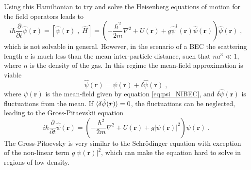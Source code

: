 Using this Hamiltonian to try and solve the Heisenberg equations of motion for the field operators leads to
\begin{equation}
	i \hbar \frac{\partial }{\partial t} \hat{\psi}(\boldsymbol{r}) = \left[ \hat{\psi}(\boldsymbol{r}) \; , \; \hat{H}  \right] = \left( - \frac{\hbar^2}{2 m} \nabla^2 + U(\boldsymbol{r}) + g \hat{\psi}^{\dag}(\boldsymbol{r}) \hat{\psi}(\boldsymbol{r}) \right) \hat{\psi}(\boldsymbol{r}) \; ,
\end{equation}
which is not solvable in general. However, in the scenario of a BEC the scattering length $a$ is much less than the mean inter-particle distance, such that $n a^3 \ll 1$, where $n$ is the density of the gas. In this regime the mean-field approximation is viable
\begin{equation}
	\hat{\psi}(\boldsymbol{r}) = \psi(\boldsymbol{r}) + \delta \hat{\psi}(\boldsymbol{r}) \; ,
\end{equation}
where $\psi(\boldsymbol{r})$ is the mean-field given by equation \ref{eq:psi_NIBEC}, and $\delta \hat{\psi}(\boldsymbol{r})$ is fluctuations from the mean. If $\braket{\delta \hat{\psi}(\boldsymbol{r})} = 0$, the fluctuations can be neglected, leading to the Gross-Pitaevskii equation \cite{Gross1961,Pitaevskii}
\begin{equation}
	i \hbar \frac{\partial }{\partial t} \hat{\psi}(\boldsymbol{r}) = \left( - \frac{\hbar^2}{2 m} \nabla^2 + U(\boldsymbol{r}) + g |\psi(\boldsymbol{r})|^2 \right) \psi(\boldsymbol{r}) \; .
\end{equation}
The Gross-Pitaevsky is very similar to the Schrödinger equation with exception of the non-linear term $g |\psi(\boldsymbol{r})|^2$, which can make the equation hard to solve in regions of low density.